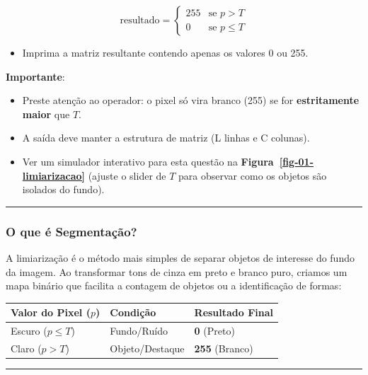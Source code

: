 \documentclass[
  portuguese,
  letterpaper,
  openany,
  oneside,
  12pt,
  a4paper]{book}
\providecommand{\tightlist}{%
  \setlength{\itemsep}{0pt}\setlength{\parskip}{0pt}}
\begin{document}
\[\text{resultado} = \begin{cases} 255 & \text{se } p > T \\ 0 & \text{se } p \le T \end{cases}\]

\begin{itemize}
\tightlist
\item
  Imprima a matriz resultante contendo apenas os valores 0 ou 255.
\end{itemize}

 \textbf{Importante}:

\begin{itemize}
\tightlist
\item
  Preste atenção ao operador: o pixel só vira branco (255) se for
  \textbf{estritamente maior} que \(T\).
\item
  A saída deve manter a estrutura de matriz (L linhas e C colunas).
\item
  Ver um simulador interativo para esta questão na
  \textbf{Figura~\ref{fig-01-limiarizacao}} (ajuste o slider de \(T\)
  para observar como os objetos são isolados do fundo).
\end{itemize}

\begin{center}\rule{0.5\linewidth}{0.5pt}\end{center}

\subsubsection{\texorpdfstring{ O que é
Segmentação?}{ O que é Segmentação?}}\label{o-que-uxe9-segmentauxe7uxe3o}

A limiarização é o método mais simples de separar objetos de interesse
do fundo da imagem. Ao transformar tons de cinza em preto e branco puro,
criamos um mapa binário que facilita a contagem de objetos ou a
identificação de formas:

\begin{longtable}[]{@{}lll@{}}
\toprule\noalign{}
Valor do Pixel (\(p\)) & Condição & Resultado Final \\
\midrule\noalign{}
\endhead
\bottomrule\noalign{}
\endlastfoot
Escuro (\(p \le T\)) & Fundo/Ruído & \textbf{0} (Preto) \\
Claro (\(p > T\)) & Objeto/Destaque & \textbf{255} (Branco) \\
\end{longtable}

\begin{center}\rule{0.5\linewidth}{0.5pt}\end{center}
\end{document}
